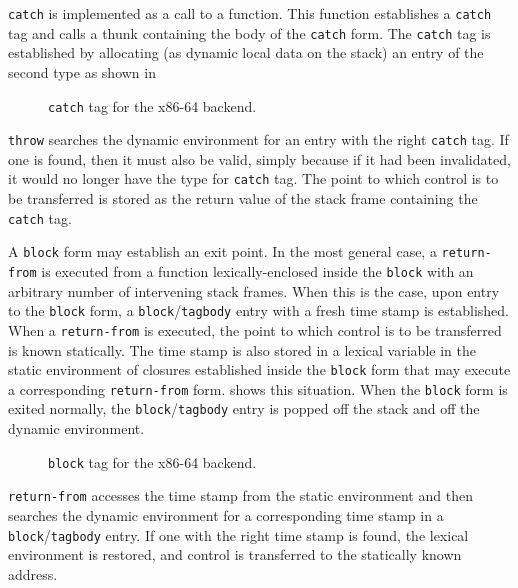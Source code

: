 \texttt{catch} is implemented as a call to a function.  This function
establishes a \texttt{catch} tag and calls a thunk containing the body
of the \texttt{catch} form.  The \texttt{catch} tag is established by
allocating (as dynamic local data on the stack) an entry of the second
type as shown in 

\begin{figure}
\begin{center}
\end{center}
\caption{\label{fig-x86-64-catch}
\texttt{catch} tag for the x86-64 backend.}
\end{figure}

\texttt{throw} searches the dynamic environment for an entry with the
right \texttt{catch} tag.  If one is found, then it must also be
valid, simply because if it had been invalidated, it would no longer
have the type for \texttt{catch} tag.  The point to which control is
to be transferred is stored as the return value of the stack frame
containing the \texttt{catch} tag.

A \texttt{block} form may establish an exit point.  In the most
general case, a \texttt{return-from} is executed from a function
lexically-enclosed inside the \texttt{block} with an arbitrary number
of intervening stack frames.  When this is the case, upon entry to the
\texttt{block} form, a \texttt{block}/\texttt{tagbody} entry with a
fresh time stamp is established.  When a \texttt{return-from} is
executed, the point to which control is to be transferred is known
statically.  The time stamp is also stored in a lexical variable in
the static environment of closures established inside the
\texttt{block} form that may execute a corresponding
\texttt{return-from} form.   shows this
situation.  When the \texttt{block} form is exited normally, the
\texttt{block}/\texttt{tagbody} entry is popped off the stack and off
the dynamic environment.

\begin{figure}
\begin{center}
\end{center}
\caption{\label{fig-x86-64-block-tag}
\texttt{block} tag for the x86-64 backend.}
\end{figure}

\texttt{return-from} accesses the time stamp from the static
environment and then searches the dynamic environment for a
corresponding time stamp in a \texttt{block}/\texttt{tagbody} entry.
If one with the right time stamp is found, the lexical environment is
restored, and control is transferred to the statically known address.


